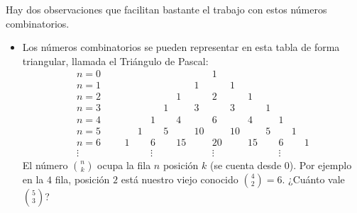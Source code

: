 Hay dos observaciones que facilitan bastante el trabajo con estos números combinatorios.
    \begin{itemize}
        \item Los números combinatorios se pueden representar en esta tabla de forma triangular, llamada el {\sf Triángulo de Pascal}:
        \begin{equation}\label{cap03:ecu:TrianguloPascal}
        \begin{array}{l|llcccccccccccccc}
        n=0&&&&&&&&&1\\
        n=1&&&&&&&&1&&1\\
        n=2&&&&&&&1&&2&&1\\
        n=3&&&&&&1&&3&&3&&1\\
        n=4&&&&&1&&4&&6&&4&&1\\
        n=5&&&&1&&5&&10&&10&&5&&1\\
        n=6&&&1&&6&&15&&20&&15&&6&&1\\
        \vdots&&& &&\vdots&& &&\vdots&& &&\vdots&&
        \end{array}
        \end{equation}
        El número $\binom{n}{k}$ ocupa la fila $n$ posición $k$ (se cuenta desde $0$). Por ejemplo en la $4$ fila, posición $2$ está nuestro viejo conocido $\binom{4}{2}=6$. ¿Cuánto vale $\binom{5}{3}$?


\end{itemize}
